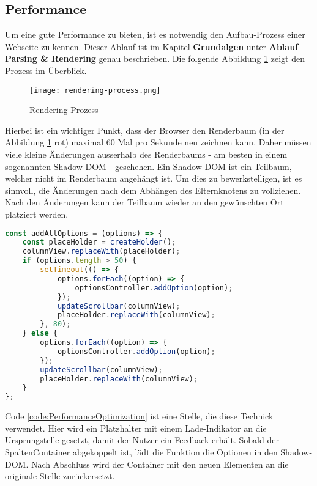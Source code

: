 \subsection{Performance}

Um eine gute Performance zu bieten, ist es notwendig den Aufbau-Prozess einer Webseite zu kennen.
Dieser Ablauf ist im Kapitel \textbf{Grundalgen} unter \textbf{Ablauf Parsing \& Rendering} genau beschrieben.
Die folgende Abbildung \ref{Abbildung:RenderingProcessRecap} zeigt den Prozess im Überblick.

\begin{figure}[!htb]
    \centering
    \texttt{[image: rendering-process.png]}
    \caption{Rendering Prozess}
    \label{Abbildung:RenderingProcessRecap}
\end{figure}

Hierbei ist ein wichtiger Punkt, dass der Browser den Renderbaum (in der Abbildung \ref{Abbildung:RenderingProcessRecap} rot) maximal 60 Mal pro Sekunde neu zeichnen kann.
Daher müssen viele kleine Änderungen ausserhalb des Renderbaums - am besten in einem sogenannten Shadow-DOM - geschehen.
Ein Shadow-DOM ist ein Teilbaum, welcher nicht im Renderbaum angehängt ist.
Um dies zu bewerkstelligen, ist es sinnvoll, die Änderungen nach dem Abhängen des Elternknotens zu vollziehen. 
Nach den Änderungen kann der Teilbaum wieder an den gewünschten Ort platziert werden.

\begin{lstlisting}[language = js, caption = Performance Optimierung (columnOptionsComponent.js), label = code:PerformanceOptimization]
const addAllOptions = (options) => {
    const placeHolder = createHolder();
    columnView.replaceWith(placeHolder);
    if (options.length > 50) {
        setTimeout(() => {
            options.forEach((option) => {
                optionsController.addOption(option);
            });
            updateScrollbar(columnView);
            placeHolder.replaceWith(columnView);
        }, 80);
    } else {
        options.forEach((option) => {
            optionsController.addOption(option);
        });
        updateScrollbar(columnView);
        placeHolder.replaceWith(columnView);
    }
};
\end{lstlisting}

Code \ref{code:PerformanceOptimization} ist eine Stelle, die diese Technick verwendet.
Hier wird ein Platzhalter mit einem Lade-Indikator an die Ursprungstelle gesetzt, damit der Nutzer ein Feedback erhält.
Sobald der SpaltenContainer abgekoppelt ist, lädt die Funktion die Optionen in den Shadow-DOM.
Nach Abschluss wird der Container mit den neuen Elementen an die originale Stelle zurückersetzt.

